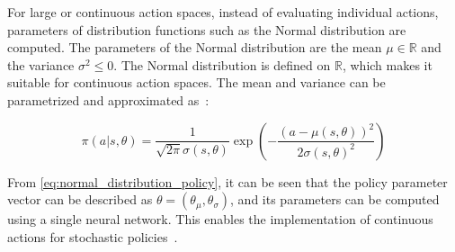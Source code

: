 \documentclass[../xlapes02]{subfiles}
\begin{document}
    For large or continuous action spaces, instead of evaluating individual actions, parameters of distribution functions such as the Normal distribution are computed. The parameters of the Normal distribution are the mean $\mu\in\mathbb{R} $ and the variance $ \sigma^2\leq 0$. The Normal distribution is defined on $\mathbb{R}$, which makes it suitable for continuous action spaces. The mean and variance can be parametrized and approximated as~\cite{sutton2018reinforcement}:

    \begin{equation}
        \label{eq:normal_distribution_policy}
        \pi(a | s, \theta) = \frac{1}{\sqrt{2\pi} \sigma(s, \theta)} \exp\left(-\frac{(a - \mu(s, \theta))^2}{2\sigma(s, \theta)^2}\right) \tag{2.37}
    \end{equation}

    From \cref{eq:normal_distribution_policy}, it can be seen that the policy parameter vector can be described as $ \theta = (\theta_{\mu}, \theta_{\sigma}) $, and its parameters can be computed using a single neural network. This enables the implementation of continuous actions for stochastic policies~\cite{FITMT25127, sutton2018reinforcement, rl-course-david-silver}.


%
%
%
%
%
%
%
%
\end{document}
